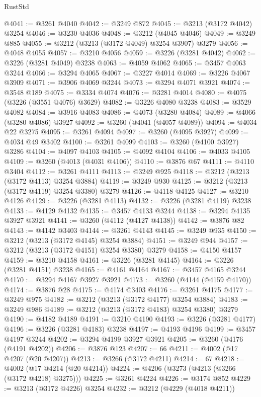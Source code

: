 \begin{lexlean}{RustStd}
\begin{coremodule}
@4041 := @3261 @4040
@4042 := @3249 @872
@4045 := @3213 (@3172 @4042) @3254
@4046 := @3230 @4036
@4048 := @3212 (@4045 @4046)
@4049 := @3249 @885
@4055 := @3212 (@3213 (@3172 @4049) @3254 @3907) @3279
@4056 := @4048 @4055
@4057 := @3210 @4056
@4059 := @3226 (@3281 @4042)
@4062 := @3226 (@3281 @4049) @3238
@4063 := @4059 @4062
@4065 := @3457 @4063 @3244
@4066 := @3294 @4065
@4067 := @3227 @4014
@4069 := @3226 @4067 @3909
@4071 := @3906 @4069 @3244
@4073 := @3294 @4071 @3921
@4074 := @3548 @189
@4075 := @3334 @4074
@4076 := @3281 @4014
@4080 := @4075 (@3226 (@3551 @4076) @3629)
@4082 := @3226 @4080 @3238
@4083 := @3529 @4082
@4084 := @3916 @4083
@4086 := @4073 (@3280 @4084)
@4089 := @4066 (@3280 @4086) @3927
@4092 := @3260 (@4041 (@4057 @4089))
@4094 := @4034 @22 @3275
@4095 := @3261 @4094
@4097 := @3260 (@4095 @3927)
@4099 := @4034 @49 @3402
@4100 := @3261 @4099
@4103 := @3260 (@4100 @3927) @3286
@4104 := @4097 @4103
@4105 := @4092 @4104
@4106 := @4033 @4105
@4109 := @3260 (@4013 (@4031 @4106))
@4110 := @3876 @67
@4111 := @4110 @3404
@4112 := @3261 @4111
@4113 := @3249 @925
@4118 := @3212 (@3213 (@3172 @4113) @3254 @3884)
@4119 := @3249 @930
@4125 := @3212 (@3213 (@3172 @4119) @3254 @3380) @3279
@4126 := @4118 @4125
@4127 := @3210 @4126
@4129 := @3226 (@3281 @4113)
@4132 := @3226 (@3281 @4119) @3238
@4133 := @4129 @4132
@4135 := @3457 @4133 @3244
@4138 := @3294 @4135 @3927 @3921
@4141 := @3260 (@4112 (@4127 @4138))
@4142 := @3876 @82
@4143 := @4142 @3403
@4144 := @3261 @4143
@4145 := @3249 @935
@4150 := @3212 (@3213 (@3172 @4145) @3254 @3884)
@4151 := @3249 @944
@4157 := @3212 (@3213 (@3172 @4151) @3254 @3380) @3279
@4158 := @4150 @4157
@4159 := @3210 @4158
@4161 := @3226 (@3281 @4145)
@4164 := @3226 (@3281 @4151) @3238
@4165 := @4161 @4164
@4167 := @3457 @4165 @3244
@4170 := @3294 @4167 @3927 @3921
@4173 := @3260 (@4144 (@4159 @4170))
@4174 := @3876 @28
@4175 := @4174 @3403
@4176 := @3261 @4175
@4177 := @3249 @975
@4182 := @3212 (@3213 (@3172 @4177) @3254 @3884)
@4183 := @3249 @986
@4189 := @3212 (@3213 (@3172 @4183) @3254 @3380) @3279
@4190 := @4182 @4189
@4191 := @3210 @4190
@4193 := @3226 (@3281 @4177)
@4196 := @3226 (@3281 @4183) @3238
@4197 := @4193 @4196
@4199 := @3457 @4197 @3244
@4202 := @3294 @4199 @3927 @3921
@4205 := @3260 (@4176 (@4191 @4202))
@4206 := @3876 @123
@4207 := 66
@4211 := @4002 (@17 @4207 (@20 @4207))
@4213 := @3266 (@3172 @4211)
@4214 := 67
@4218 := @4002 (@17 @4214 (@20 @4214))
@4224 := @4206 (@3273 (@4213 (@3266 (@3172 @4218) @3275)))
@4225 := @3261 @4224
@4226 := @3174 @852
@4229 := @3213 (@3172 @4226) @3254
@4232 := @3212 (@4229 (@4018 @4211))

\end{coremodule}
\end{lexlean}
